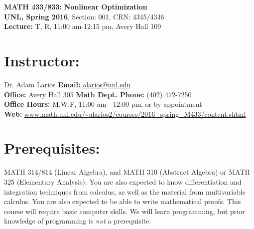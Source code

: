\documentclass[margin]{res}
\theoremstyle{plain}
\theoremstyle{definition}
\theoremstyle{remark}
\begin{document}
\begin{center}
   \textbf{MATH 433/833:} 
   \textbf{Nonlinear Optimization}\\
   \textbf{UNL, Spring 2016}, Section: 001, CRN: 4345/4346
    \\
   \textbf{Lecture:} T, R, 11:00 am-12:15 pm, Avery Hall 109\\
\end{center}
%
\vspace{-0.2in}
%
\begin{resume}
\section{Instructor:} Dr. Adam Larios 
\hfill \textbf{Email:} 
\url{alarios@unl.edu}
\\
\textbf{Office:} Avery Hall 305
\hfill
\textbf{Math Dept. Phone:} (402) 472-7250
\\
\textbf{Office Hours:} M,W,F, 11:00 am - 12:00 pm, or by appointment
\hfill
\\
\textbf{Web:} \url{www.math.unl.edu/~alarios2/courses/2016_spring_M433/content.shtml}



 \section{Prerequisites:} MATH 314/814 (Linear Algebra), and MATH 310 (Abstract Algebra) or MATH 325 (Elementary Analysis).  You are also expected to know differentiation and integration techniques from calculus, as well as the material from multivariable calculus.   You are also expected to be able to write mathematical proofs.  This course will require basic computer skills.  We will learn programming, but prior knowledge of programming is \textit{not} a prerequisite.
 

\end{resume}
\end{document}
